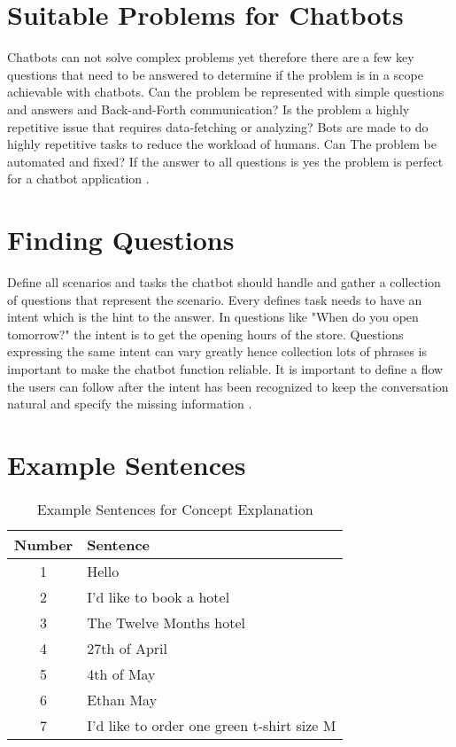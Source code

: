 \documentclass[12pt, backref]{report}
\begin{document}
\section{Suitable Problems for Chatbots}
Chatbots can not solve complex problems yet therefore there are a few key questions that need to be answered to determine if the problem is in a scope achievable with chatbots.
Can the problem be represented with simple questions and answers and Back-and-Forth communication?
Is the problem a highly repetitive issue that requires data-fetching or analyzing? Bots are made to do highly repetitive tasks to reduce the workload of humans.
Can The problem be automated and fixed?
If the answer to all questions is yes the problem is perfect for a chatbot application \cite{buiildChatbotsPython}.

\section{Finding Questions}
Define all scenarios and tasks the chatbot should handle and gather a collection of questions that represent the scenario. Every defines task needs to have an intent which is the hint to the answer. In questions like "When do you open tomorrow?" the intent is to get the opening hours of the store. Questions expressing the same intent can vary greatly hence collection lots of phrases is important to make the chatbot function reliable. It is important to define a flow the users can follow after the intent has been recognized to keep the conversation natural and specify the missing information \cite{buiildChatbotsPython}.


\section{Example Sentences}\label{sec:example_sentences}

\begin{table}
	\centering
	\begin{tabular}{ c || l }
		Number & Sentence \\ \hline \hline
		1 & Hello \\ \hline
		2 & I'd like to book a hotel \\ \hline
		3 & The Twelve Months hotel \\ \hline
		4 & 27th of April \\ \hline
		5 & 4th of May \\ \hline
		6 & Ethan May \\ \hline
		7 & I'd like to order one green t-shirt size M \\ \hline
	\end{tabular}
	\caption{Example Sentences for Concept Explanation} \label{tab:example_sentences}
\end{table} \noindent
\end{document}
